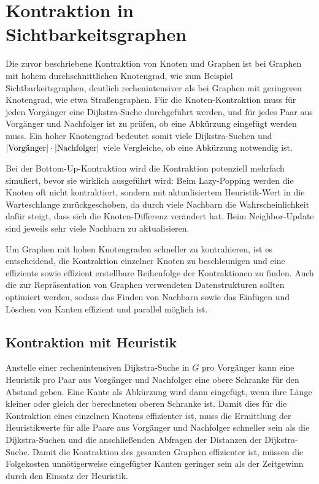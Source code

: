 \chapter{Kontraktion in Sichtbarkeitsgraphen}\label{chapter:kontraktion}

Die zuvor beschriebene Kontraktion von Knoten und Graphen ist bei Graphen mit hohem durchschnittlichen Knotengrad, wie zum Beispiel Sichtbarkeitsgraphen, deutlich rechenintensiver als bei Graphen mit geringeren Knotengrad, wie etwa Straßengraphen.
Für die Knoten-Kontraktion muss für jeden Vorgänger eine Dijkstra-Suche durchgeführt werden, und für jedes Paar aus Vorgänger und Nachfolger ist zu prüfen, ob eine Abkürzung eingefügt werden muss.
Ein hoher Knotengrad bedeutet somit viele Dijkstra-Suchen und $\abs{\text{Vorgänger}} \cdot \abs{\text{Nachfolger}}$ viele Vergleiche, ob eine Abkürzung notwendig ist.

Bei der Bottom-Up-Kontraktion wird die Kontraktion potenziell mehrfach simuliert, bevor sie wirklich ausgeführt wird:
Beim Lazy-Popping werden die Knoten oft nicht kontraktiert, sondern mit aktualisiertem Heuristik-Wert in die Warteschlange zurückgeschoben, da durch viele Nachbarn die Wahrscheinlichkeit dafür steigt, dass sich die Knoten-Differenz verändert hat.
Beim Neighbor-Update sind jeweils sehr viele Nachbarn zu aktualisieren.

Um Graphen mit hohen Knotengraden schneller zu kontrahieren, ist es entscheidend, die Kontraktion einzelner Knoten zu beschleunigen und eine effiziente sowie effizient erstellbare Reihenfolge der Kontraktionen zu finden.
Auch die zur Repräsentation von Graphen verwendeten Datenstrukturen sollten optimiert werden, sodass das Finden von Nachbarn sowie das Einfügen und Löschen von Kanten effizient und parallel möglich ist.

\section{Kontraktion mit Heuristik}

Anstelle einer rechenintensiven Dijkstra-Suche in $G$ pro Vorgänger kann eine Heuristik pro Paar aus Vorgänger und Nachfolger eine obere Schranke für den Abstand geben.
Eine Kante als Abkürzung wird dann eingefügt, wenn ihre Länge kleiner oder gleich der berechneten oberen Schranke ist.
Damit dies für die Kontraktion eines einzelnen Knotens effizienter ist, muss die Ermittlung der Heuristikwerte für alle Paare aus Vorgänger und Nachfolger schneller sein als die Dijkstra-Suchen und die anschließenden Abfragen der Distanzen der Dijkstra-Suche.
Damit die Kontraktion des gesamten Graphen effizienter ist, müssen die Folgekosten unnötigerweise eingefügter Kanten geringer sein als der Zeitgewinn durch den Einsatz der Heuristik.

